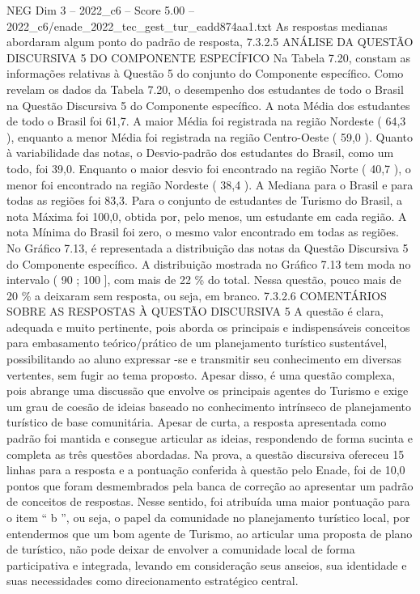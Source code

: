 \begin{textsample}{NEG Dim 3 – 2022\_c6 – Score 5.00 – 2022\_c6/enade\_2022\_tec\_gest\_tur\_eadd874aa1.txt}
As respostas medianas abordaram algum ponto do padrão de resposta, 7.3.2.5 ANÁLISE DA QUESTÃO DISCURSIVA 5 DO COMPONENTE ESPECÍFICO Na Tabela 7.20, constam as informações relativas à Questão 5 do conjunto do Componente específico.
Como revelam os dados da Tabela 7.20, o desempenho dos estudantes de todo o Brasil na Questão Discursiva 5 do Componente específico.
A nota Média dos estudantes de todo o Brasil foi 61,7.
A maior Média foi registrada na região Nordeste ( 64,3 ), enquanto a menor Média foi registrada na região Centro-Oeste ( 59,0 ).
Quanto à variabilidade das notas, o Desvio-padrão dos estudantes do Brasil, como um todo, foi 39,0.
Enquanto o maior desvio foi encontrado na região Norte ( 40,7 ), o menor foi encontrado na região Nordeste ( 38,4 ).
A Mediana para o Brasil e para todas as regiões foi 83,3.
Para o conjunto de estudantes de Turismo do Brasil, a nota Máxima foi 100,0, obtida por, pelo menos, um estudante em cada região.
A nota Mínima do Brasil foi zero, o mesmo valor encontrado em todas as regiões.
No Gráfico 7.13, é representada a distribuição das notas da Questão Discursiva 5 do Componente específico.
A distribuição mostrada no Gráfico 7.13 tem moda no intervalo ( 90 ; 100 ], com mais de 22 \% do total.
Nessa questão, pouco mais de 20 \% a deixaram sem resposta, ou seja, em branco. 7.3.2.6 COMENTÁRIOS SOBRE AS RESPOSTAS À QUESTÃO DISCURSIVA 5 A questão é clara, adequada e muito pertinente, pois aborda os principais e indispensáveis conceitos para embasamento teórico/prático de um planejamento turístico sustentável, possibilitando ao aluno expressar -se e transmitir seu conhecimento em diversas vertentes, sem fugir ao tema proposto.
Apesar disso, é uma questão complexa, pois abrange uma discussão que envolve os principais agentes do Turismo e exige um grau de coesão de ideias baseado no conhecimento intrínseco de planejamento turístico de base comunitária.
Apesar de curta, a resposta apresentada como padrão foi mantida e consegue articular as ideias, respondendo de forma sucinta e completa as três questões abordadas.
Na prova, a questão discursiva ofereceu 15 linhas para a resposta e a pontuação conferida à questão pelo Enade, foi de 10,0 pontos que foram desmembrados pela banca de correção ao apresentar um padrão de conceitos de respostas.
Nesse sentido, foi atribuída uma maior pontuação para o item “ b ”, ou seja, o papel da comunidade no planejamento turístico local, por entendermos que um bom agente de Turismo, ao articular uma proposta de plano de turístico, não pode deixar de envolver a comunidade local de forma participativa e integrada, levando em consideração seus anseios, sua identidade e suas necessidades como direcionamento estratégico central.

\end{textsample}
